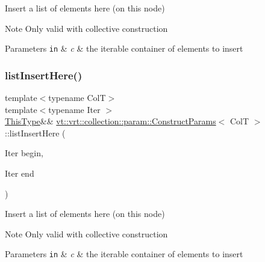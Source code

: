 Insert a list of elements here (on this node) 

\begin{DoxyNote}{Note}
Only valid with collective construction
\end{DoxyNote}

\begin{DoxyParams}[1]{Parameters}
\mbox{\tt in}  & {\em c} & the iterable container of elements to insert \\
\hline
\end{DoxyParams}
\mbox{\label{structvt_1_1vrt_1_1collection_1_1param_1_1_construct_params_a76b651b37044ec8602f04ac97c90035b}} 
\subsubsection{\texorpdfstring{list\+Insert\+Here()}{listInsertHere()}\hspace{0.1cm}{\footnotesize\ttfamily [2/2]}}
{\footnotesize\ttfamily template$<$typename ColT$>$ \\
template$<$typename Iter $>$ \\
\hyperlink{structvt_1_1vrt_1_1collection_1_1param_1_1_construct_params_a13d4910c0f6825c7b0ddfebce5288bea}{This\+Type}\&\& \hyperlink{structvt_1_1vrt_1_1collection_1_1param_1_1_construct_params}{vt\+::vrt\+::collection\+::param\+::\+Construct\+Params}$<$ ColT $>$\+::list\+Insert\+Here (\begin{DoxyParamCaption}\item[{Iter}]{begin,  }\item[{Iter}]{end }\end{DoxyParamCaption})\hspace{0.3cm}{\ttfamily [inline]}}



Insert a list of elements here (on this node) 

\begin{DoxyNote}{Note}
Only valid with collective construction
\end{DoxyNote}

\begin{DoxyParams}[1]{Parameters}
\mbox{\tt in}  & {\em c} & the iterable container of elements to insert \\
\hline
\end{DoxyParams}
\mbox{\label{structvt_1_1vrt_1_1collection_1_1param_1_1_construct_params_af1b7987a920abbb7bed2cc49e4cfb85e}} 
